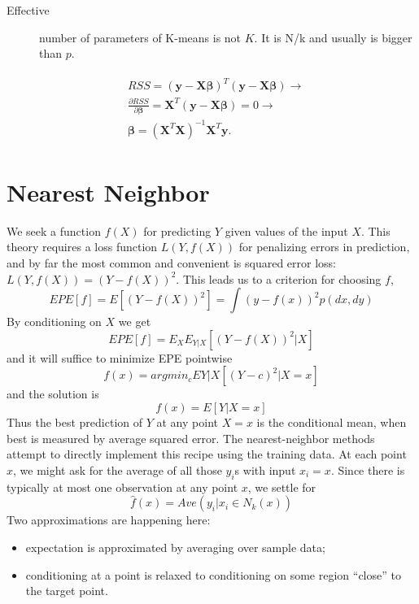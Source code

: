 \begin{description}
\item [Effective] number of parameters of K-means is
not $K$. It is {N/k} and usually is bigger than $p$.
\end{description}

\begin{gather} %
\begin{aligned} 
& RSS = (\mathbf{ y - X} \bm \beta)^T (\mathbf{ y - X} \bm \beta)  \rightarrow \\ 
& \frac{\partial RSS}{\partial \bm \beta} = \bm X^T (\mathbf{y - X} \bm \beta) = 0  \rightarrow  \\
& \bm \beta = (\mathbf{X}^T\mathbf{X})^{-1} \mathbf{X}^T \mathbf{y}.
\end{aligned} 
\end{gather} 

\section{Nearest Neighbor}
We seek a function $f(X)$ for predicting $Y$ given values of the input $X$. 
This theory requires a loss function $L(Y, f(X))$ for penalizing errors in prediction, 
and by far the most common and convenient is squared error 
loss: $L(Y, f(X)) = (Y - f(X))^2$. This leads us to a criterion for choosing $f$,
\begin{equation}
EPE[f] = E[(Y - f(X))^2]
= \int (y - f(x))^2 p(dx, dy)
\end{equation}
By conditioning on $X$ we get 
\begin{equation}
EPE[f] = E_XE_{Y|X}[(Y - f(X))^2|X]
\end{equation}
and it will suffice to minimize EPE pointwise
\begin{equation}
f(x) = argmin_cE{Y|X}[(Y-c)^2|X=x]
\end{equation}
and the solution is 
\begin{equation}
f(x) = E[Y|X=x]
\end{equation}
Thus the best prediction of $Y$ at any point $X=x$ is the 
conditional mean, when best is measured by average squared error.
The nearest-neighbor methods attempt to directly 
implement this recipe using the training data. At each point $x$, 
we might ask for the average of all those $y_i$s with input $x_i=x$. 
Since there is typically at most one observation at any point $x$, we settle for
\begin{equation}
\hat f(x) = Ave(y_i|x_i \in N_k(x))
\end{equation}
Two approximations are happening here:
\begin{itemize}
\item expectation is approximated by averaging over sample data;
\item conditioning at a point is relaxed to conditioning on some region
``close'' to the target point. 
\end{itemize}

